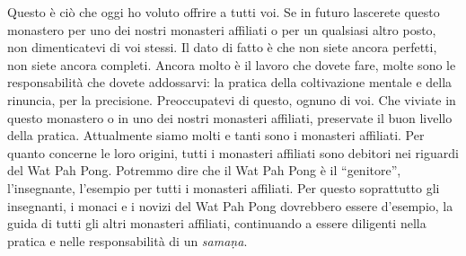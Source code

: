 Questo è ciò che oggi ho voluto offrire a tutti voi. Se in futuro
lascerete questo monastero per uno dei nostri monasteri affiliati o per
un qualsiasi altro posto, non dimenticatevi di voi stessi. Il dato di
fatto è che non siete ancora perfetti, non siete ancora completi. Ancora
molto è il lavoro che dovete fare, molte sono le responsabilità che
dovete addossarvi: la pratica della coltivazione mentale e della
rinuncia, per la precisione. Preoccupatevi di questo, ognuno di voi. Che
viviate in questo monastero o in uno dei nostri monasteri affiliati,
preservate il buon livello della pratica. Attualmente siamo molti e
tanti sono i monasteri affiliati. Per quanto concerne le loro origini,
tutti i monasteri affiliati sono debitori nei riguardi del Wat Pah Pong.
Potremmo dire che il Wat Pah Pong è il ``genitore'', l'insegnante,
l'esempio per tutti i monasteri affiliati. Per questo soprattutto gli
insegnanti, i monaci e i novizi del Wat Pah Pong dovrebbero essere
d'esempio, la guida di tutti gli altri monasteri affiliati, continuando
a essere diligenti nella pratica e nelle responsabilità di un
\emph{samaṇa}.

